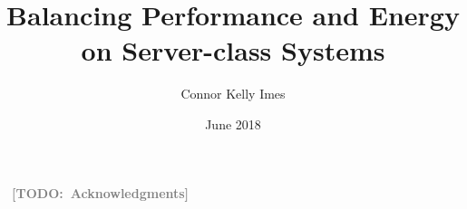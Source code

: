 \documentclass{ucetd}
\title{Balancing Performance and Energy on Server-class Systems}
\author{Connor Kelly Imes}
\date{June 2018}
\newcommand{\TODO}[1]{\textcolor{gray}{\textbf{\ [TODO:\ #1]\ }}}
\begin{document}
\maketitle

\makecopyright
\makededication


\tableofcontents
\listoffigures
\listoftables

\acknowledgments
% 
\TODO{Acknowledgments}


\mainmatter







\end{document}
